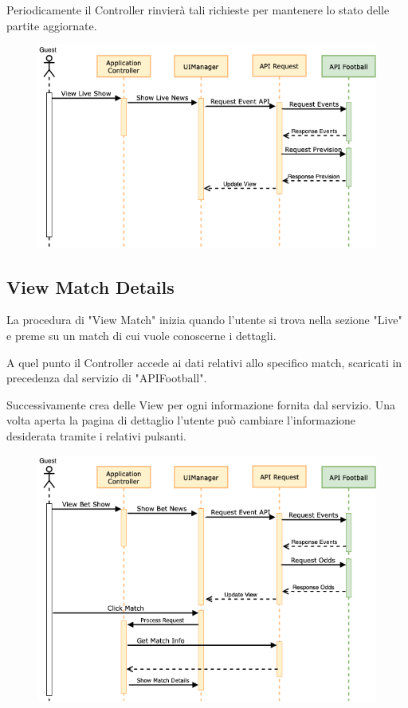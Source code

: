\documentclass[numbers=noenddot, 12pt, a4paper, oneside]{scrbook}
\begin{document}
Periodicamente il Controller rinvierà tali richieste per mantenere lo stato delle partite aggiornate.
\begin{figure}[H]
	\centering
	\includegraphics[width=1\textwidth]{images/Sequence/SequenceLive}
\end{figure}


\newpage
\subsection*{View Match Details}
La procedura di "View Match" inizia quando l'utente si trova nella sezione "Live" e preme su un match di cui vuole conoscerne i dettagli.

A quel punto il Controller accede ai dati relativi allo specifico match, scaricati in precedenza dal servizio di "APIFootball".

Successivamente crea delle View per ogni informazione fornita dal servizio. Una volta aperta la pagina di dettaglio l'utente può cambiare l'informazione desiderata tramite i relativi pulsanti.
\begin{figure}[H]
	\centering
	\includegraphics[width=1\textwidth]{images/Sequence/SequenceMatchDetails}
\end{figure}
\end{document}
